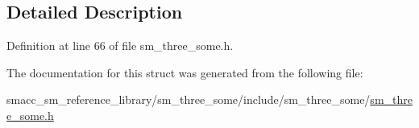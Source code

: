 \subsection{Detailed Description}


Definition at line 66 of file sm\+\_\+three\+\_\+some.\+h.



The documentation for this struct was generated from the following file\+:\begin{DoxyCompactItemize}
\item 
smacc\+\_\+sm\+\_\+reference\+\_\+library/sm\+\_\+three\+\_\+some/include/sm\+\_\+three\+\_\+some/\hyperlink{sm__three__some_8h}{sm\+\_\+three\+\_\+some.\+h}\end{DoxyCompactItemize}
